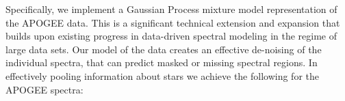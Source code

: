 \documentclass[a4paper,fleqn,usenatbib]{mnras}
\begin{document}
Specifically, we implement a Gaussian Process mixture model representation of the APOGEE data. This is a significant technical extension and expansion that builds upon existing progress in data-driven spectral modeling in the regime of large data sets. Our model of the data creates an effective de-noising of the individual spectra, that can predict masked or missing spectral regions. In effectively pooling information about stars we achieve the following for the APOGEE spectra: \\



 
 













\end{document}
